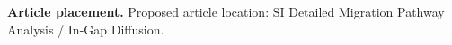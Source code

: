 \textbf{Article placement.} Proposed article location: SI Detailed Migration Pathway Analysis / In-Gap Diffusion.

